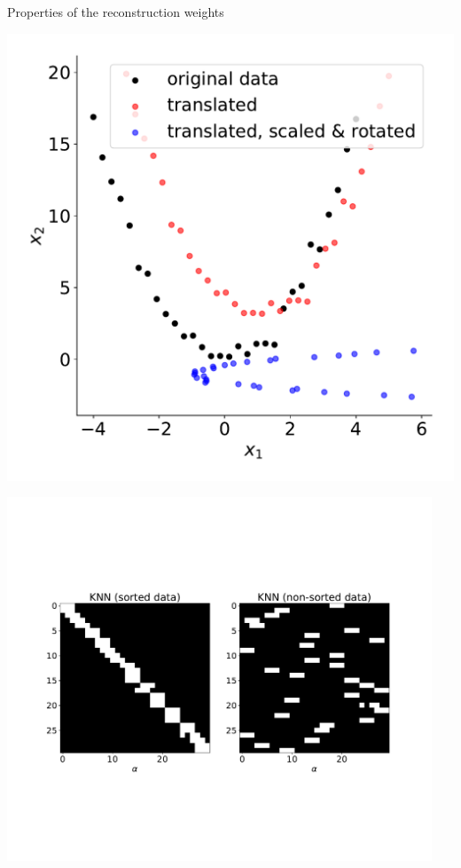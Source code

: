 \begin{frame}{Properties of the reconstruction weights}
\begin{minipage}{0.28\textwidth}
\begin{center}
	\includegraphics[width=1.2\textwidth]{img/parabola_data}
\end{center}
\end{minipage}
\begin{minipage}{0.7\textwidth}
\begin{center}
	\includegraphics[width=0.95\textwidth]{img/parabola_knn}
\end{center}
\end{minipage}

\end{frame}

